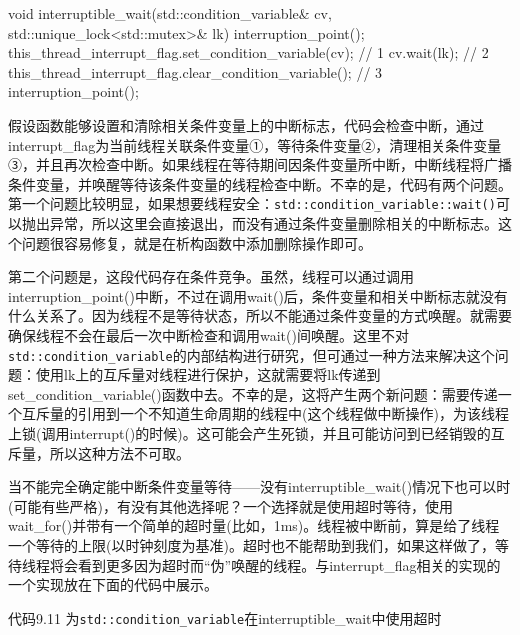 \begin{cpp}
void interruptible_wait(std::condition_variable& cv,
std::unique_lock<std::mutex>& lk)
{
  interruption_point();
  this_thread_interrupt_flag.set_condition_variable(cv);  // 1
  cv.wait(lk);  // 2
  this_thread_interrupt_flag.clear_condition_variable();  // 3
  interruption_point();
}
\end{cpp}

假设函数能够设置和清除相关条件变量上的中断标志，代码会检查中断，通过interrupt\_flag为当前线程关联条件变量①，等待条件变量②，清理相关条件变量③，并且再次检查中断。如果线程在等待期间因条件变量所中断，中断线程将广播条件变量，并唤醒等待该条件变量的线程检查中断。不幸的是，代码有两个问题。第一个问题比较明显，如果想要线程安全：\texttt{std::condition\_variable::wait()}可以抛出异常，所以这里会直接退出，而没有通过条件变量删除相关的中断标志。这个问题很容易修复，就是在析构函数中添加删除操作即可。

第二个问题是，这段代码存在条件竞争。虽然，线程可以通过调用interruption\_point()中断，不过在调用wait()后，条件变量和相关中断标志就没有什么关系了。因为线程不是等待状态，所以不能通过条件变量的方式唤醒。就需要确保线程不会在最后一次中断检查和调用wait()间唤醒。这里不对\texttt{std::condition\_variable}的内部结构进行研究，但可通过一种方法来解决这个问题：使用lk上的互斥量对线程进行保护，这就需要将lk传递到set\_condition\_variable()函数中去。不幸的是，这将产生两个新问题：需要传递一个互斥量的引用到一个不知道生命周期的线程中(这个线程做中断操作)，为该线程上锁(调用interrupt()的时候)。这可能会产生死锁，并且可能访问到已经销毁的互斥量，所以这种方法不可取。

当不能完全确定能中断条件变量等待——没有interruptible\_wait()情况下也可以时(可能有些严格)，有没有其他选择呢？一个选择就是使用超时等待，使用wait\_for()并带有一个简单的超时量(比如，1ms)。线程被中断前，算是给了线程一个等待的上限(以时钟刻度为基准)。超时也不能帮助到我们，如果这样做了，等待线程将会看到更多因为超时而“伪”唤醒的线程。与interrupt\_flag相关的实现的一个实现放在下面的代码中展示。

代码9.11 为\texttt{std::condition\_variable}在interruptible\_wait中使用超时

